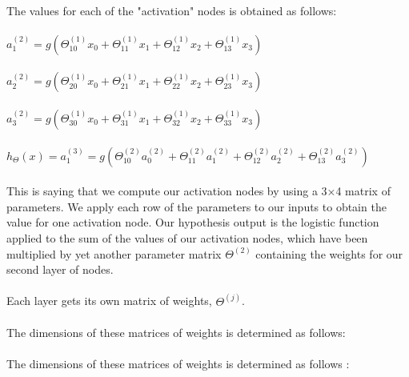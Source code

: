 \documentclass[UTF8]{ctexart}
\begin{document}
\paragraph{}
The values for each of the "activation" nodes is obtained as follows:
\begin{algorithm}
\paragraph{}
$a_{1}^{(2)}=g(\Theta_{10}^{(1)}x_{0}+\Theta_{11}^{(1)}x_{1}+\Theta_{12}^{(1)}x_{2}+\Theta_{13}^{(1)}x_{3})$
\paragraph{}
$a_{2}^{(2)}=g(\Theta_{20}^{(1)}x_{0}+\Theta_{21}^{(1)}x_{1}+\Theta_{22}^{(1)}x_{2}+\Theta_{23}^{(1)}x_{3})$
\paragraph{}
$a_{3}^{(2)}=g(\Theta_{30}^{(1)}x_{0}+\Theta_{31}^{(1)}x_{1}+\Theta_{32}^{(1)}x_{2}+\Theta_{33}^{(1)}x_{3})$
\paragraph{}
$h_{\Theta}(x)=a_{1}^{(3)}=g(\Theta_{10}^{(2)}a_{0}^{(2)}+\Theta_{11}^{(2)}a_{1}^{(2)}+\Theta_{12}^{(2)}a_{2}^{(2)}+\Theta_{13}^{(2)}a_{3}^{(2)})$
\end{algorithm}
\paragraph{}
This is saying that we compute our activation nodes by using a 3×4 matrix of parameters. We apply each row of the parameters to our inputs to obtain the value for one activation node. Our hypothesis output is the logistic function applied to the sum of the values of our activation nodes, which have been multiplied by yet another parameter matrix $ \Theta^{(2)} $ containing the weights for our second layer of nodes.
\paragraph{}
Each layer gets its own matrix of weights, $\Theta^{(j)}$.
\paragraph{}
The dimensions of these matrices of weights is determined as follows:
\paragraph{}
The dimensions of these matrices of weights is determined as follows
:
\end{document}
